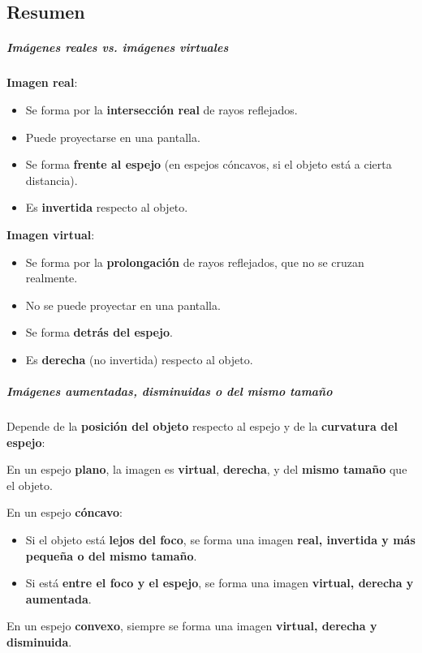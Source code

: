 \subsection{Resumen}

\begin{tcolorbox}[remember, title=Imágenes]
  \subparagraph{Imágenes reales vs. imágenes virtuales}
  \textbf{Imagen real}:
  \begin{itemize}
    \item Se forma por la \textbf{intersección real} de rayos reflejados.
    \item Puede proyectarse en una pantalla.
    \item Se forma \textbf{frente al espejo} (en espejos cóncavos, si el objeto está a cierta distancia).
    \item Es \textbf{invertida} respecto al objeto.
  \end{itemize}

  \textbf{Imagen virtual}:
  \begin{itemize}
    \item Se forma por la \textbf{prolongación} de rayos reflejados, que no se cruzan realmente.
    \item No se puede proyectar en una pantalla.
    \item Se forma \textbf{detrás del espejo}.
    \item Es \textbf{derecha} (no invertida) respecto al objeto.
  \end{itemize}

  \subparagraph{Imágenes aumentadas, disminuidas o del mismo tamaño}

  Depende de la \textbf{posición del objeto} respecto al espejo y de la \textbf{curvatura del espejo}:

  En un espejo \textbf{plano}, la imagen es \textbf{virtual}, \textbf{derecha}, y del \textbf{mismo tamaño} que el objeto.
  
  En un espejo \textbf{cóncavo}:
  \begin{itemize}
    \item Si el objeto está \textbf{lejos del foco}, se forma una imagen \textbf{real, invertida y más pequeña o del mismo tamaño}.
    \item Si está \textbf{entre el foco y el espejo}, se forma una imagen \textbf{virtual, derecha y aumentada}.
  \end{itemize}
  
  En un espejo \textbf{convexo}, siempre se forma una imagen \textbf{virtual, derecha y disminuida}.
  
\end{tcolorbox}